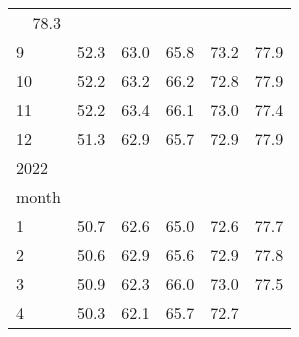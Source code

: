 \begin{tabular}{llllll}
  \multicolumn{1}{r}{78.3} \\
\multicolumn{1}{l}{\hspace{3em}9} &
  \multicolumn{1}{|r}{52.3} &
  \multicolumn{1}{r}{63.0} &
  \multicolumn{1}{r}{65.8} &
  \multicolumn{1}{r}{73.2} &
  \multicolumn{1}{r}{77.9} \\
\multicolumn{1}{l}{\hspace{3em}10} &
  \multicolumn{1}{|r}{52.2} &
  \multicolumn{1}{r}{63.2} &
  \multicolumn{1}{r}{66.2} &
  \multicolumn{1}{r}{72.8} &
  \multicolumn{1}{r}{77.9} \\
\multicolumn{1}{l}{\hspace{3em}11} &
  \multicolumn{1}{|r}{52.2} &
  \multicolumn{1}{r}{63.4} &
  \multicolumn{1}{r}{66.1} &
  \multicolumn{1}{r}{73.0} &
  \multicolumn{1}{r}{77.4} \\
\multicolumn{1}{l}{\hspace{3em}12} &
  \multicolumn{1}{|r}{51.3} &
  \multicolumn{1}{r}{62.9} &
  \multicolumn{1}{r}{65.7} &
  \multicolumn{1}{r}{72.9} &
  \multicolumn{1}{r}{77.9} \\
\multicolumn{1}{l}{\hspace{1em}2022} &
  \multicolumn{1}{|r}{} &
  \multicolumn{1}{r}{} &
  \multicolumn{1}{r}{} &
  \multicolumn{1}{r}{} &
  \multicolumn{1}{r}{} \\
\multicolumn{1}{l}{\hspace{2em}month} &
  \multicolumn{1}{|r}{} &
  \multicolumn{1}{r}{} &
  \multicolumn{1}{r}{} &
  \multicolumn{1}{r}{} &
  \multicolumn{1}{r}{} \\
\multicolumn{1}{l}{\hspace{3em}1} &
  \multicolumn{1}{|r}{50.7} &
  \multicolumn{1}{r}{62.6} &
  \multicolumn{1}{r}{65.0} &
  \multicolumn{1}{r}{72.6} &
  \multicolumn{1}{r}{77.7} \\
\multicolumn{1}{l}{\hspace{3em}2} &
  \multicolumn{1}{|r}{50.6} &
  \multicolumn{1}{r}{62.9} &
  \multicolumn{1}{r}{65.6} &
  \multicolumn{1}{r}{72.9} &
  \multicolumn{1}{r}{77.8} \\
\multicolumn{1}{l}{\hspace{3em}3} &
  \multicolumn{1}{|r}{50.9} &
  \multicolumn{1}{r}{62.3} &
  \multicolumn{1}{r}{66.0} &
  \multicolumn{1}{r}{73.0} &
  \multicolumn{1}{r}{77.5} \\
\multicolumn{1}{l}{\hspace{3em}4} &
  \multicolumn{1}{|r}{50.3} &
  \multicolumn{1}{r}{62.1} &
  \multicolumn{1}{r}{65.7} &
  \multicolumn{1}{r}{72.7} &

\end{tabular}
